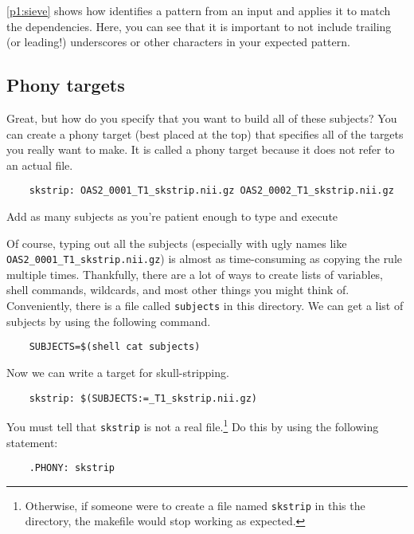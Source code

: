 \autoref{p1:sieve} shows how \maken{} identifies a pattern from an input and applies it to match the dependencies. Here, you can see that it is important to not include trailing (or leading!) underscores or other characters in your expected pattern.

\subsection{Phony targets}

Great, but how do you specify that you want to build all of these
subjects? You can create a phony target (best placed at the top) that
specifies all of the targets you really want to make. It is called a
phony target because it does not refer to an actual file.
\begin{lstlisting}
	skstrip: OAS2_0001_T1_skstrip.nii.gz OAS2_0002_T1_skstrip.nii.gz
\end{lstlisting}

Add as many subjects as you're patient enough to type and execute

Of course, typing out all the subjects (especially with ugly names
like \texttt{OAS2_0001_T1_skstrip.nii.gz}) is almost as time-consuming
as copying the rule multiple times. Thankfully, there are a lot of
ways to create lists of variables, shell commands, wildcards, and most
other things you might think of. Conveniently, there is a file called
\texttt{subjects} in this directory. We can get a list of subjects by
using the following \maken{} command. 
\begin{lstlisting}
	SUBJECTS=$(shell cat subjects)
\end{lstlisting} 

Now we can write a target for skull-stripping.
\begin{lstlisting}
	skstrip: $(SUBJECTS:=_T1_skstrip.nii.gz)
\end{lstlisting}

You must tell \maken{} that \texttt{skstrip} is not a real
file.\footnote{Otherwise, if someone were to create a file named
\texttt{skstrip} in this the directory, the makefile would stop
working as expected.} Do this by using the following statement:
\begin{lstlisting}
	.PHONY: skstrip
\end{lstlisting}

